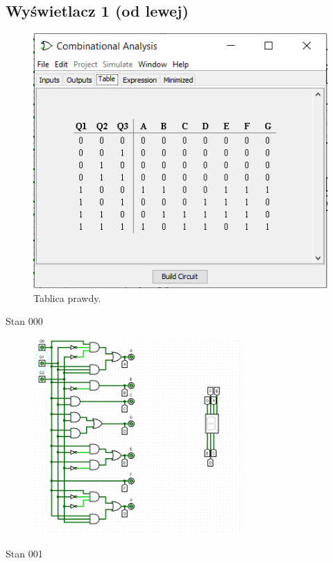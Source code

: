 \documentclass[]{article}
\begin{document}
\subsection{Wyświetlacz 1 (od lewej)}

\begin{figure}[H]
	\centering
	\includegraphics[width=1\textwidth]{JEDEN_Tab.png}
	\caption{Tablica prawdy.}
\end{figure}
\newpage
Stan 000
\begin{figure}[H]
	\centering
	\includegraphics[width=0.7\textwidth]{JEDEN_000.png}
\end{figure}
\newpage
Stan 001
\end{document}
